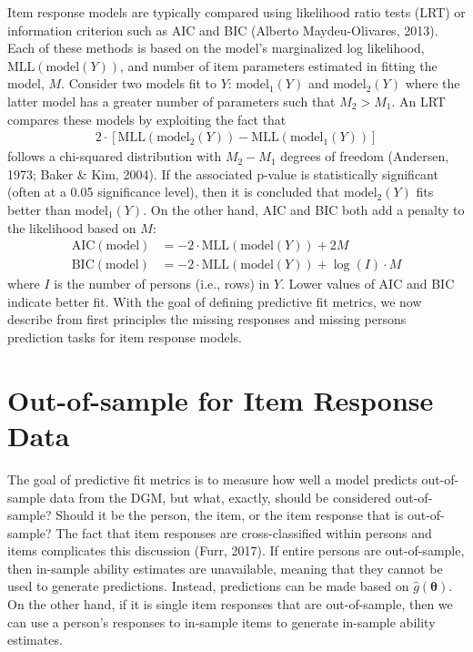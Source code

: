 \documentclass[
  english,
  man,floatsintext]{apa7}
\begin{document}
Item response models are typically compared using likelihood ratio tests (LRT) or information criterion such as AIC and BIC (Alberto Maydeu-Olivares, 2013). Each of these methods is based on the model's marginalized log likelihood, \(\text{MLL}(\text{model}(Y))\), and number of item parameters estimated in fitting the model, \(M\). Consider two models fit to \(Y\): \(\text{model}_1(Y)\) and \(\text{model}_2(Y)\) where the latter model has a greater number of parameters such that \(M_2 > M_1\). An LRT compares these models by exploiting the fact that
\begin{align}
2 \cdot [\text{MLL}(\text{model}_2(Y)) - \text{MLL}(\text{model}_1(Y))]
\end{align}
follows a chi-squared distribution with \(M_2 - M_1\) degrees of freedom (Andersen, 1973; Baker \& Kim, 2004). If the associated p-value is statistically significant (often at a 0.05 significance level), then it is concluded that \(\text{model}_2(Y)\) fits better than \(\text{model}_1(Y)\). On the other hand, AIC and BIC both add a penalty to the likelihood based on \(M\):
\begin{align}
\text{AIC}(\text{model}) &= -2 \cdot \text{MLL}(\text{model}(Y)) + 2M \\
\text{BIC}(\text{model}) &= -2 \cdot \text{MLL}(\text{model}(Y)) + \log(I) \cdot M
\end{align}
where \(I\) is the number of persons (i.e., rows) in \(Y\). Lower values of AIC and BIC indicate better fit. With the goal of defining predictive fit metrics, we now describe from first principles the missing responses and missing persons prediction tasks for item response models.

\hypertarget{oos}{%
\section{Out-of-sample for Item Response Data}\label{oos}}

The goal of predictive fit metrics is to measure how well a model predicts out-of-sample data from the DGM, but what, exactly, should be considered out-of-sample? Should it be the person, the item, or the item response that is out-of-sample? The fact that item responses are cross-classified within persons and items complicates this discussion (Furr, 2017). If entire persons are out-of-sample, then in-sample ability estimates are unavailable, meaning that they cannot be used to generate predictions. Instead, predictions can be made based on \(\hat g(\bm{\theta})\). On the other hand, if it is single item responses that are out-of-sample, then we can use a person's responses to in-sample items to generate in-sample ability estimates.
\end{document}
